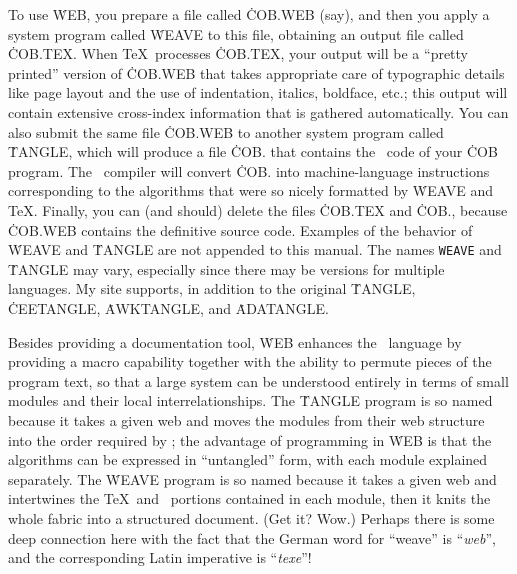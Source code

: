 To use \.{WEB}, you prepare a file called \.{COB.WEB} (say), and then you
apply a system program called \.{WEAVE} to this file, obtaining an output
file called \.{COB.TEX}.
When \TeX\ processes \.{COB.TEX}, your output
will be a ``pretty printed'' version of \.{COB.WEB} that takes appropriate
care of typographic details like page layout and the use of indentation,
italics, boldface, etc.; this output will contain extensive cross-index
information that is gathered automatically.
You can also submit the same
file \.{COB.WEB} to another system program called \.{TANGLE}, which will
produce a file \.{COB.\PAS} that contains the \PASCAL\ code of your \.{COB}
program.
The \PASCAL\ compiler will convert \.{COB.\PAS} into
machine-language instructions corresponding to the algorithms that were so
nicely formatted by \.{WEAVE} and \TeX.
Finally, you can (and should)
delete the files \.{COB.TEX} and \.{COB.\PAS}, because \.{COB.WEB} contains
the definitive source code.
Examples of the behavior of \.{WEAVE} and
\.{TANGLE} are 
\newstuff
not
\endnewstuff
appended to this manual.
\newstuff
The names {\tt WEAVE} and \.{TANGLE} may vary, especially since there
may be versions for multiple languages.
My site supports, in addition to the original \.{TANGLE},
\.{CEETANGLE}, \.{AWKTANGLE}, and \.{ADATANGLE}.
\endnewstuff

Besides providing a documentation tool, \.{WEB} enhances the \PASCAL\
language by providing a 
 macro capability together with the
ability to permute pieces of the program text, so that a large system can
be understood entirely in terms of small modules and their local
interrelationships.
The \.{TANGLE} program is so named because it takes a
given web and moves the modules from their web structure into the order
required by \PASCAL; the advantage of programming in \.{WEB} is that the
algorithms can be expressed in ``untangled'' form, with each module
explained separately.
The \.{WEAVE} program is so named because it takes
a given web and intertwines the \TeX\ and \PASCAL\ portions contained in
each module, then it knits the whole fabric into a structured document.
(Get it? Wow.)  
Perhaps there is some deep connection here with the fact
that the German word for ``weave'' is ``{\it web\/}'', and the
corresponding Latin imperative is ``{\it texe\/}''!

